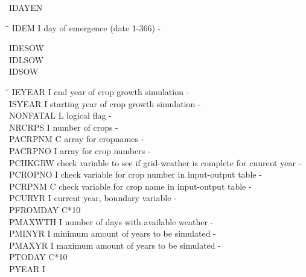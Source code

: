 \documentclass[11pt]{article}
\begin{document}
IDAYEN\nwln
\begin{tabbing}
\hspace{1.27cm}\=\hspace{1.27cm}\=\hspace{1.27cm}\=\hspace{1.27cm}\=%
\hspace{1.27cm}\=\hspace{1.27cm}\=\hspace{1.27cm}\=\hspace{1.27cm}\=%
\hspace{1.27cm}\=\hspace{1.27cm}\=\kill
IDEM\> \> I\> day of emergence (date 1-366)\> \> \> \> \> \> \> -
\end{tabbing}
IDESOW\\
IDLSOW\\
IDSOW\nwln
\begin{tabbing}
\hspace{1.27cm}\=\hspace{1.27cm}\=\hspace{1.27cm}\=\hspace{1.27cm}\=%
\hspace{1.27cm}\=\hspace{1.27cm}\=\hspace{1.27cm}\=\hspace{1.27cm}\=%
\hspace{1.27cm}\=\hspace{1.27cm}\=\kill
IEYEAR\> \> I\> end year of crop growth simulation\> \> \> \> \> \> \> -\\
ISYEAR\> \> I\> starting year of crop growth simulation\> \> \> \> \> \> \> -\\
NONFATAL\> \> L\> logical flag\> \> \> \> \> \> \> -\\
NRCRPS\> \> I\> number of crops\> \> \> \> \> \> \> -\\
PACRPNM\> \> C\> array for cropnames\> \> \> \> \> \> \> -\\
PACRPNO\> \> I\> array for crop numbers\> \> \> \> \> \> \> -\\
PCHKGRW\> \> \> check variable to see if grid-weather is complete for cuurent year\> \> \> \> \> \> \> -\\
PCROPNO\> \> I\> check variable for crop number in input-output table\> \> \> \> \> \> \> -\\
PCRPNM\> \> C\> check variable for crop name in input-output table\> \> \> \> \> \> \> -\\
PCURYR\> \> I\> current year, boundary variable\> \> \> \> \> \> \> -\\
PFROMDAY\> \> C*10\\
PMAXWTH\> \> I\> number of days with available weather\> \> \> \> \> \> \> -\\
PMINYR\> \> I\> minimum amount of years to be simulated\> \> \> \> \> \> \> -\\
PMAXYR\> \> I\> maximum amount of years to be simulated\> \> \> \> \> \> \> -\\
PTODAY\> \> C*10\\
PYEAR\> \> I
\end{tabbing}
\end{document}
